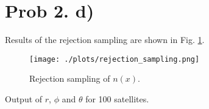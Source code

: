 \section{Prob 2. d)}

Results of the rejection sampling are shown in Fig. \ref{fig:fig4}.



\begin{figure}[ht!]
  \centering
  \texttt{[image: ./plots/rejection\_sampling.png]}
  \caption{Rejection sampling of $n(x)$.}
  \label{fig:fig4}
\end{figure}

Output of $r$, $\phi$ and $\theta$ for 100 satellites.


